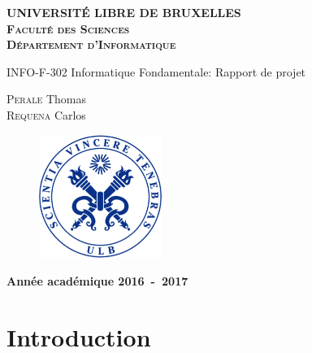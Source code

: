 \documentclass[letterpaper]{article}
\begin{document}
\begin{titlepage}
  \begin{center}
    \textbf{\textsc{UNIVERSIT\'E LIBRE DE BRUXELLES}}\\
    \textbf{\textsc{Faculté des Sciences}}\\
    \textbf{\textsc{Département d'Informatique}}
    \vfill{}\vfill{}
    \begin{center}{\Huge INFO-F-302 Informatique Fondamentale: Rapport de projet}\end{center}{\Huge \par}
    \begin{center}{\large \textsc{Perale} Thomas\\\textsc{Requena} Carlos}\end{center}{\Huge \par}
    \vfill{}\vfill{}
    \vfill{}\vfill{}\enlargethispage{3cm}

    \begin{figure} [h!]
      \centering
      \includegraphics[width=4cm]{Sigle_ULB.png}
    \end{figure}

    \textbf{Année académique 2016~-~2017}
  \end{center}

\end{titlepage}

\tableofcontents
\pagebreak

\section{Introduction}
\end{document}
